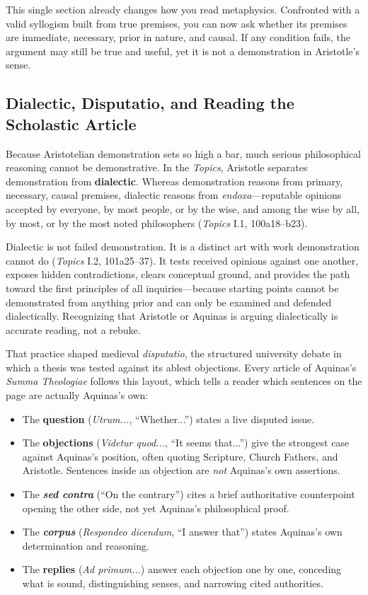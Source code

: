 This single section already changes how you read metaphysics. Confronted with a valid syllogism built from true premises, you can now ask whether its premises are immediate, necessary, prior in nature, and causal. If any condition fails, the argument may still be true and useful, yet it is not a demonstration in Aristotle's sense.

\subsection{Dialectic, Disputatio, and Reading the Scholastic Article}

Because Aristotelian demonstration sets so high a bar, much serious philosophical reasoning cannot be demonstrative. In the \emph{Topics}, Aristotle separates demonstration from \textbf{dialectic}. Whereas demonstration reasons from primary, necessary, causal premises, dialectic reasons from \emph{endoxa}---reputable opinions accepted by everyone, by most people, or by the wise, and among the wise by all, by most, or by the most noted philosophers (\emph{Topics} I.1, 100a18--b23).

Dialectic is not failed demonstration. It is a distinct art with work demonstration cannot do (\emph{Topics} I.2, 101a25--37). It tests received opinions against one another, exposes hidden contradictions, clears conceptual ground, and provides the path toward the first principles of all inquiries---because starting points cannot be demonstrated from anything prior and can only be examined and defended dialectically. Recognizing that Aristotle or Aquinas is arguing dialectically is accurate reading, not a rebuke.

That practice shaped medieval \emph{disputatio}, the structured university debate in which a thesis was tested against its ablest objections. Every article of Aquinas's \emph{Summa Theologiae} follows this layout, which tells a reader which sentences on the page are actually Aquinas's own:

\begin{itemize}
\item The \textbf{question} (\emph{Utrum...}, ``Whether...'') states a live disputed issue.
\item The \textbf{objections} (\emph{Videtur quod...}, ``It seems that...'') give the strongest case against Aquinas's position, often quoting Scripture, Church Fathers, and Aristotle. Sentences inside an objection are \emph{not} Aquinas's own assertions.
\item The \textbf{\emph{sed contra}} (``On the contrary'') cites a brief authoritative counterpoint opening the other side, not yet Aquinas's philosophical proof.
\item The \textbf{\emph{corpus}} (\emph{Respondeo dicendum}, ``I answer that'') states Aquinas's own determination and reasoning.
\item The \textbf{replies} (\emph{Ad primum...}) answer each objection one by one, conceding what is sound, distinguishing senses, and narrowing cited authorities.
\end{itemize}

